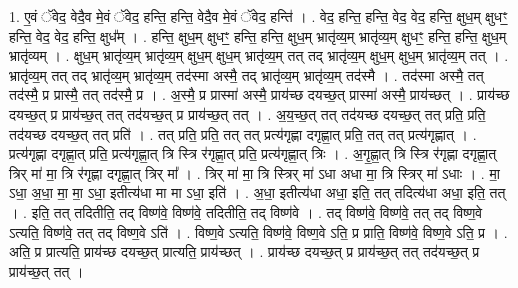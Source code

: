 \documentclass[17pt]{extarticle}
\begin{document}
1. ए॒वं ॅवेद॒ वेदै॒व मे॒वं ॅवेद॒ हन्ति॒ हन्ति॒ वेदै॒व मे॒वं ॅवेद॒ हन्ति॑ । . वेद॒ हन्ति॒ हन्ति॒ वेद॒ वेद॒ हन्ति॒ क्षुध॒म् क्षुधꣳ॒॒ हन्ति॒ वेद॒ वेद॒ हन्ति॒ क्षुध᳚म् । . हन्ति॒ क्षुध॒म् क्षुधꣳ॒॒ हन्ति॒ हन्ति॒ क्षुध॒म् भ्रातृ॑व्य॒म् भ्रातृ॑व्य॒म् क्षुधꣳ॒॒ हन्ति॒ हन्ति॒ क्षुध॒म् भ्रातृ॑व्यम् । . क्षुध॒म् भ्रातृ॑व्य॒म् भ्रातृ॑व्य॒म् क्षुध॒म् क्षुध॒म् भ्रातृ॑व्य॒म् तत् तद् भ्रातृ॑व्य॒म् क्षुध॒म् क्षुध॒म् भ्रातृ॑व्य॒म् तत् । . भ्रातृ॑व्य॒म् तत् तद् भ्रातृ॑व्य॒म् भ्रातृ॑व्य॒म् तद॑स्मा अस्मै॒ तद् भ्रातृ॑व्य॒म् भ्रातृ॑व्य॒म् तद॑स्मै । . तद॑स्मा अस्मै॒ तत् तद॑स्मै॒ प्र प्रास्मै॒ तत् तद॑स्मै॒ प्र । . अ॒स्मै॒ प्र प्रास्मा॑ अस्मै॒ प्राय॑च्छ दयच्छ॒त् प्रास्मा॑ अस्मै॒ प्राय॑च्छत् । . प्राय॑च्छ दयच्छ॒त् प्र प्राय॑च्छ॒त् तत् तद॑यच्छ॒त् प्र प्राय॑च्छ॒त् तत् । . अ॒य॒च्छ॒त् तत् तद॑यच्छ दयच्छ॒त् तत् प्रति॒ प्रति॒ तद॑यच्छ दयच्छ॒त् तत् प्रति॑ । . तत् प्रति॒ प्रति॒ तत् तत् प्रत्य॑गृह्णा दगृह्णा॒त् प्रति॒ तत् तत् प्रत्य॑गृह्णात् । . प्रत्य॑गृह्णा दगृह्णा॒त् प्रति॒ प्रत्य॑गृह्णा॒त् त्रि स्त्रि र॑गृह्णा॒त् प्रति॒ प्रत्य॑गृह्णा॒त् त्रिः । . अ॒गृ॒ह्णा॒त् त्रि स्त्रि र॑गृह्णा दगृह्णा॒त् त्रिर् मा॑ मा॒ त्रि र॑गृह्णा दगृह्णा॒त् त्रिर् मा᳚ । . त्रिर् मा॑ मा॒ त्रि स्त्रिर् मा॑ ऽधा अधा मा॒ त्रि स्त्रिर् मा॑ ऽधाः । . मा॒ ऽधा॒ अ॒धा॒ मा॒ मा॒ ऽधा॒ इतीत्य॑धा मा मा ऽधा॒ इति॑ । . अ॒धा॒ इतीत्य॑धा अधा॒ इति॒ तत् तदित्य॑धा अधा॒ इति॒ तत् । . इति॒ तत् तदितीति॒ तद् विष्ण॑वे॒ विष्ण॑वे॒ तदितीति॒ तद् विष्ण॑वे । . तद् विष्ण॑वे॒ विष्ण॑वे॒ तत् तद् विष्ण॒वे ऽत्यति॒ विष्ण॑वे॒ तत् तद् विष्ण॒वे ऽति॑ । . विष्ण॒वे ऽत्यति॒ विष्ण॑वे॒ विष्ण॒वे ऽति॒ प्र प्राति॒ विष्ण॑वे॒ विष्ण॒वे ऽति॒ प्र । . अति॒ प्र प्रात्यति॒ प्राय॑च्छ दयच्छ॒त् प्रात्यति॒ प्राय॑च्छत् । . प्राय॑च्छ दयच्छ॒त् प्र प्राय॑च्छ॒त् तत् तद॑यच्छ॒त् प्र प्राय॑च्छ॒त् तत् । \newline
\end{document}
